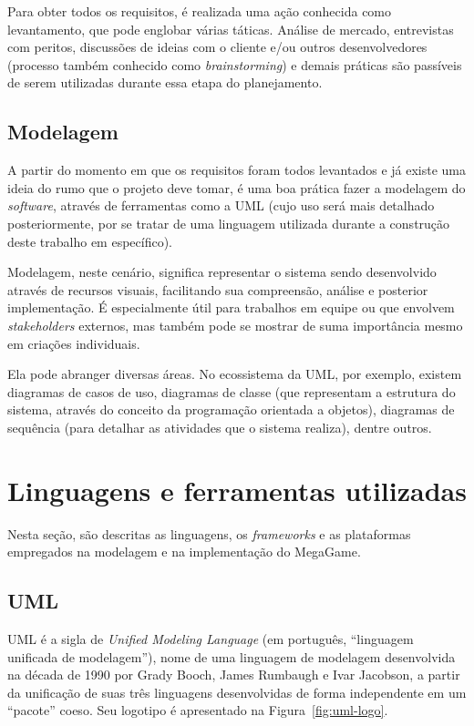 \documentclass[
  12pt,
  a4paper,
  oneside,
  chapter=TITLE,
  subsection=TITLE,
  sumario=abnt-6027-2012,
  english,
  brazil
]{abntex2}
\begin{document}
Para obter todos os requisitos, é realizada uma ação conhecida como
levantamento, que pode englobar várias táticas. Análise de mercado,
entrevistas com peritos, discussões de ideias com o cliente e/ou outros
desenvolvedores (processo também conhecido como \emph{brainstorming}) e
demais práticas são passíveis de serem utilizadas durante essa etapa do
planejamento.

\subsection{Modelagem}

A partir do momento em que os requisitos foram todos levantados e já
existe uma ideia do rumo que o projeto deve tomar, é uma boa prática
fazer a modelagem do \emph{software}, através de ferramentas como a UML
(cujo uso será mais detalhado posteriormente, por se tratar de uma
linguagem utilizada durante a construção deste trabalho em específico).

Modelagem, neste cenário, significa representar o sistema sendo
desenvolvido através de recursos visuais, facilitando sua compreensão,
análise e posterior implementação. É especialmente útil para trabalhos
em equipe ou que envolvem \emph{stakeholders} externos, mas também pode
se mostrar de suma importância mesmo em criações individuais.

Ela pode abranger diversas áreas. No ecossistema da UML, por exemplo,
existem diagramas de casos de uso, diagramas de classe (que representam
a estrutura do sistema, através do conceito da programação orientada a
objetos), diagramas de sequência (para detalhar as atividades que o
sistema realiza), dentre outros.

\section{Linguagens e ferramentas utilizadas}

Nesta seção, são descritas as linguagens, os \emph{frameworks} e as
plataformas empregados na modelagem e na implementação do MegaGame.

\subsection{UML}

UML é a sigla de \emph{Unified Modeling Language} (em português,
``linguagem unificada de modelagem''), nome de uma linguagem de modelagem
desenvolvida na década de 1990 por Grady Booch, James Rumbaugh e Ivar
Jacobson, a partir da unificação de suas três linguagens desenvolvidas
de forma independente em um ``pacote'' coeso. Seu logotipo é
apresentado na Figura~\ref{fig:uml-logo}.
\end{document}
